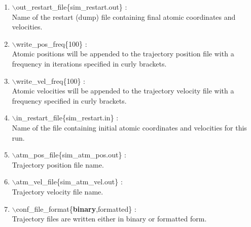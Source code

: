 \documentclass[12pt,titlepage]{article}
\begin{document}
\begin{enumerate}
\vspace{0.15in} 
 \item   $\backslash$out\_restart\_file\{sim\_restart.out\} : \\
   Name of the restart (dump) file containing final atomic 
          coordinates and velocities.


 \vspace{0.15in} 
 \item   $\backslash$write\_pos\_freq\{100\} : \\
    Atomic positions will be appended to the trajectory position file with
    a frequency in iterations specified in curly brackets.

 \vspace{0.15in} 
 \item   $\backslash$write\_vel\_freq\{100\} : \\
    Atomic velocities will be appended to the trajectory velocity file with
    a frequency specified in curly brackets.


 
 \vspace{0.15in} 
 \item   $\backslash$in\_restart\_file\{sim\_restart.in\} : \\
     Name of the file containing initial atomic coordinates and
     velocities for this run.


 \vspace{0.15in}
 \item   $\backslash$atm\_pos\_file\{sim\_atm\_pos.out\} : \\
     Trajectory position file name.

 \vspace{0.15in} 
 \item   $\backslash$atm\_vel\_file\{sim\_atm\_vel.out\} : \\
  Trajectory velocity file name.  


 
  
 
 \vspace{0.15in} 
 \item   $\backslash$conf\_file\_format\{{\bf binary},formatted\} : \\
   Trajectory files are written either in binary or formatted form.



\end{enumerate}
\end{document}
